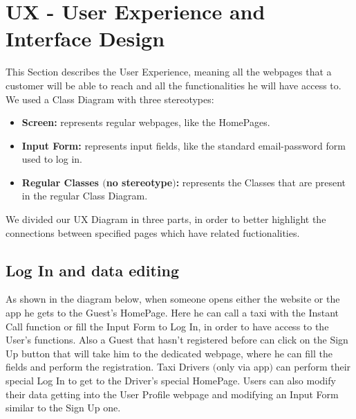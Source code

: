 \section{UX - User Experience and Interface Design}

This Section describes the User Experience, meaning all the webpages that a customer will be able to reach and all the functionalities he will have access to.
\newline
We used a Class Diagram with three stereotypes:
\begin {itemize}
\item \textbf{Screen:} represents regular webpages, like the HomePages.
\item \textbf{Input Form:} represents input fields, like the standard email-password form used to log in.
\item \textbf{Regular Classes $($no stereotype$)$:} represents the Classes that are present in the regular Class Diagram.
\end {itemize} 




We divided our UX Diagram in three parts, in order to better highlight the connections between specified pages which have related fuctionalities.

\subsection{Log In and data editing}
As shown in the diagram below, when someone opens either the website or the app he gets to the Guest's HomePage. Here he can call a taxi with the Instant Call function or fill the Input Form to Log In, in order to have access to the User's functions. Also a Guest that hasn't registered before can click on the Sign Up button that will take him to the dedicated webpage, where he can fill the fields and perform the registration.\newline
Taxi Drivers $($only via app$)$ can perform their special Log In to get to the Driver's special HomePage. \newline
Users can also modify their data getting into the User Profile webpage and modifying an Input Form similar to the Sign Up one.